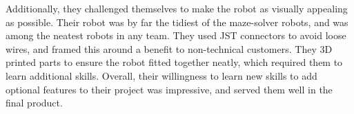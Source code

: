         Additionally, they challenged themselves to make the robot as visually appealing as possible.
        Their robot was by far the tidiest of the maze-solver robots, and was among the neatest robots in any team.
        They used JST connectors to avoid loose wires, and framed this around a benefit to non-technical customers.
        They 3D printed parts to ensure the robot fitted together neatly, which required them to learn additional skills.
        Overall, their willingness to learn new skills to add optional features to their project was impressive, and served them well in the final product.
